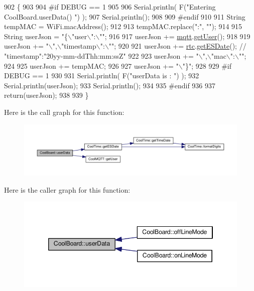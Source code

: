 \begin{DoxyCode}
902 \{
903 
904 \textcolor{preprocessor}{#if DEBUG == 1}
905 
906     Serial.println( F(\textcolor{stringliteral}{"Entering CoolBoard.userData() "}) );
907     Serial.println();
908 
909 \textcolor{preprocessor}{#endif}
910 
911     String tempMAC = WiFi.macAddress();
912 
913     tempMAC.replace(\textcolor{stringliteral}{":"}, \textcolor{stringliteral}{""});
914 
915     String userJson = \textcolor{stringliteral}{"\{\(\backslash\)"user\(\backslash\)":\(\backslash\)""};
916 
917     userJson += \hyperlink{classCoolBoard_a2399f44d7c23c1149a335cb3b46d90f1}{mqtt}.\hyperlink{classCoolMQTT_a373cc92fca7760d886f02d8a6e5b3f63}{getUser}();
918 
919     userJson += \textcolor{stringliteral}{"\(\backslash\)",\(\backslash\)"timestamp\(\backslash\)":\(\backslash\)""};
920 
921     userJson += \hyperlink{classCoolBoard_a50d2a6716879d64a85f3c6b44ad63275}{rtc}.\hyperlink{classCoolTime_ac4f32ee513c1328d984306645e8785a4}{getESDate}(); \textcolor{comment}{// "timestamp":"20yy-mm-ddThh:mm:ssZ"}
922 
923     userJson += \textcolor{stringliteral}{"\(\backslash\)",\(\backslash\)"mac\(\backslash\)":\(\backslash\)""};
924 
925     userJson += tempMAC;
926 
927     userJson += \textcolor{stringliteral}{"\(\backslash\)"\}"};
928 
929 \textcolor{preprocessor}{#if DEBUG == 1}
930 
931     Serial.println( F(\textcolor{stringliteral}{"userData is : "}) );
932     Serial.println(userJson);
933     Serial.println();
934 
935 \textcolor{preprocessor}{#endif  }
936     
937     \textcolor{keywordflow}{return}(userJson);
938     
939 \}
\end{DoxyCode}
Here is the call graph for this function\+:
\nopagebreak
\begin{figure}[H]
\begin{center}
\leavevmode
\includegraphics[width=350pt]{classCoolBoard_ae7358fb6e623cfc81b775f5f1734909b_cgraph}
\end{center}
\end{figure}
Here is the caller graph for this function\+:
\nopagebreak
\begin{figure}[H]
\begin{center}
\leavevmode
\includegraphics[width=346pt]{classCoolBoard_ae7358fb6e623cfc81b775f5f1734909b_icgraph}
\end{center}
\end{figure}


